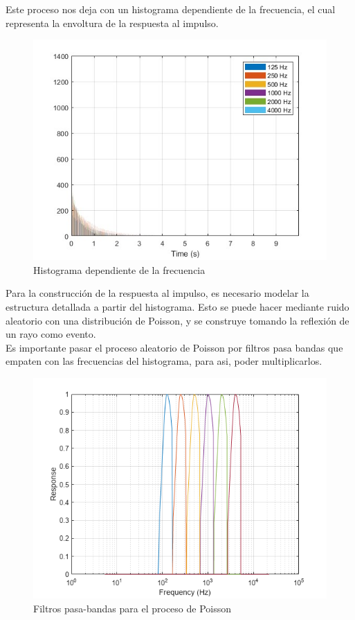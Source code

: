 Este proceso nos deja con un histograma dependiente de la frecuencia, el cual representa la envoltura de la respuesta al impulso.
\begin{figure}[!htb]
    \centering
    \includegraphics[width=\linewidth]{imagenes/Histogram.jpg}
    \caption{\footnotesize Histograma dependiente de la frecuencia}
    \label{fig:Histograma}
\end{figure}
\FloatBarrier
Para la construcción de la respuesta al impulso, es necesario modelar la estructura detallada a partir del histograma. Esto se puede hacer mediante ruido aleatorio con una distribución de Poisson, y se construye tomando la reflexión de un rayo como evento.\\
Es importante pasar el proceso aleatorio de Poisson por filtros pasa bandas que empaten con las frecuencias del histograma, para asi, poder multiplicarlos. 
\begin{figure}[!htb]
    \centering
    \includegraphics[width=\linewidth]{imagenes/BandPassFilters.png}
    \caption{\footnotesize Filtros pasa-bandas para el proceso de Poisson}
    \label{fig:PoissonFilters}
\end{figure}
